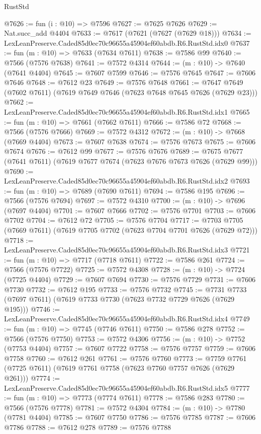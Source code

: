 \begin{lexlean}{RustStd}
\begin{coremodule}
@7626 := fun (i : @10) => @7596
@7627 := @7625 @7626
@7629 := Nat.succ_add @4404
@7633 := @7617 (@7621 (@7627 (@7629 @18)))
@7634 := LexLeanPreserve.Caded85d0ec70c96655a45904ef60abdb.R6.RustStd.idx0
@7637 := fun (m : @10) => @7633 (@7634 @7611)
@7638 := @7586 @99
@7640 := @7566 (@7576 @7638)
@7641 := @7572 @4314
@7644 := (m : @10) -> @7640 (@7641 @4404)
@7645 := @7607 @7599
@7646 := @7576 @7645
@7647 := @7606 @7646
@7648 := @7612 @23
@7649 := @7576 @7648
@7661 := @7647 @7649 (@7602 @7611) (@7619 @7649 @7646 (@7623 @7648 @7645 @7626 (@7629 @23)))
@7662 := LexLeanPreserve.Caded85d0ec70c96655a45904ef60abdb.R6.RustStd.idx1
@7665 := fun (m : @10) => @7661 (@7662 @7611)
@7666 := @7586 @72
@7668 := @7566 (@7576 @7666)
@7669 := @7572 @4312
@7672 := (m : @10) -> @7668 (@7669 @4404)
@7673 := @7607 @7638
@7674 := @7576 @7673
@7675 := @7606 @7674
@7676 := @7612 @99
@7677 := @7576 @7676
@7689 := @7675 @7677 (@7641 @7611) (@7619 @7677 @7674 (@7623 @7676 @7673 @7626 (@7629 @99)))
@7690 := LexLeanPreserve.Caded85d0ec70c96655a45904ef60abdb.R6.RustStd.idx2
@7693 := fun (m : @10) => @7689 (@7690 @7611)
@7694 := @7586 @195
@7696 := @7566 (@7576 @7694)
@7697 := @7572 @4310
@7700 := (m : @10) -> @7696 (@7697 @4404)
@7701 := @7607 @7666
@7702 := @7576 @7701
@7703 := @7606 @7702
@7704 := @7612 @72
@7705 := @7576 @7704
@7717 := @7703 @7705 (@7669 @7611) (@7619 @7705 @7702 (@7623 @7704 @7701 @7626 (@7629 @72)))
@7718 := LexLeanPreserve.Caded85d0ec70c96655a45904ef60abdb.R6.RustStd.idx3
@7721 := fun (m : @10) => @7717 (@7718 @7611)
@7722 := @7586 @261
@7724 := @7566 (@7576 @7722)
@7725 := @7572 @4308
@7728 := (m : @10) -> @7724 (@7725 @4404)
@7729 := @7607 @7694
@7730 := @7576 @7729
@7731 := @7606 @7730
@7732 := @7612 @195
@7733 := @7576 @7732
@7745 := @7731 @7733 (@7697 @7611) (@7619 @7733 @7730 (@7623 @7732 @7729 @7626 (@7629 @195)))
@7746 := LexLeanPreserve.Caded85d0ec70c96655a45904ef60abdb.R6.RustStd.idx4
@7749 := fun (m : @10) => @7745 (@7746 @7611)
@7750 := @7586 @278
@7752 := @7566 (@7576 @7750)
@7753 := @7572 @4306
@7756 := (m : @10) -> @7752 (@7753 @4404)
@7757 := @7607 @7722
@7758 := @7576 @7757
@7759 := @7606 @7758
@7760 := @7612 @261
@7761 := @7576 @7760
@7773 := @7759 @7761 (@7725 @7611) (@7619 @7761 @7758 (@7623 @7760 @7757 @7626 (@7629 @261)))
@7774 := LexLeanPreserve.Caded85d0ec70c96655a45904ef60abdb.R6.RustStd.idx5
@7777 := fun (m : @10) => @7773 (@7774 @7611)
@7778 := @7586 @283
@7780 := @7566 (@7576 @7778)
@7781 := @7572 @4304
@7784 := (m : @10) -> @7780 (@7781 @4404)
@7785 := @7607 @7750
@7786 := @7576 @7785
@7787 := @7606 @7786
@7788 := @7612 @278
@7789 := @7576 @7788

\end{coremodule}
\end{lexlean}
